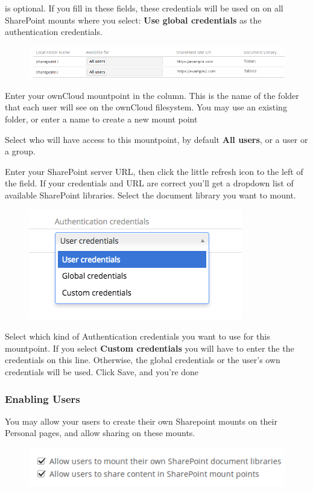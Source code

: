 \documentclass[letterpaper,10pt,english]{sphinxmanual}
\begin{document}
 is optional. If you fill in these fields, these
credentials will be used on on all SharePoint mounts where you select: \textbf{Use
global credentials} as the authentication credentials.
\begin{figure}[htbp]
\centering

\includegraphics{sharepoint-2.png}
\end{figure}

Enter your ownCloud mountpoint in the  column. This is the
name of the folder that each user will see on the ownCloud filesystem. You may
use an existing folder, or enter a name to create a new mount point

Select who will have access to this mountpoint, by default \textbf{All users}, or a
user or a group.

Enter your SharePoint server URL, then click the little refresh icon to the left
of the  field. If your credentials and URL are correct
you'll get a dropdown list of available SharePoint libraries. Select the
document library you want to mount.
\begin{figure}[htbp]
\centering

\includegraphics{sharepoint-3.png}
\end{figure}

Select which kind of Authentication credentials you want to use for this
mountpoint. If you select \textbf{Custom credentials} you will have to enter the
the credentials on this line. Otherwise, the global credentials or the user's
own credentials will be used. Click Save, and you're done


\subsubsection{Enabling Users}
\label{enterprise_external_storage/sharepoint-integration_configuration:enabling-users}
You may allow your users to create their own Sharepoint mounts on their
Personal pages, and allow sharing on these mounts.
\begin{figure}[htbp]
\centering

\includegraphics{sharepoint-4.png}
\end{figure}
\end{document}
